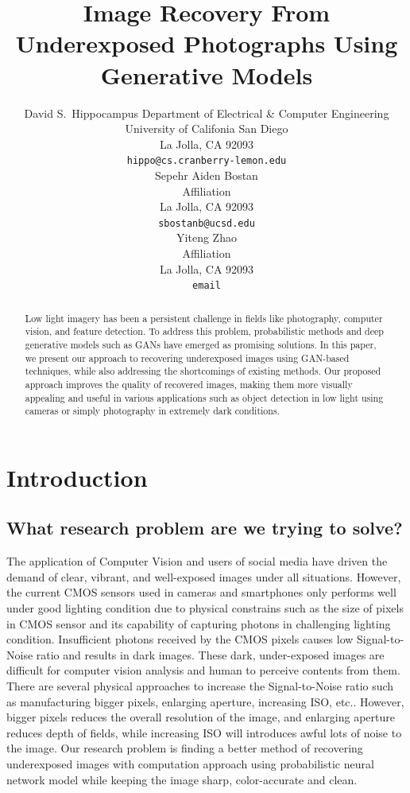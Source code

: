 \documentclass{article}
\title{Image Recovery From Underexposed Photographs Using Generative Models}
\author{
  David S.~Hippocampus
  Department of Electrical & Computer Engineering\\
  University of Califonia San Diego\\
  La Jolla, CA 92093 \\
  \texttt{hippo@cs.cranberry-lemon.edu} \\
  \And
  Sepehr Aiden Bostan\\
  Affiliation\\
  La Jolla, CA 92093\\
  \texttt{sbostanb@ucsd.edu}\\
  \And
  Yiteng Zhao \\
  Affiliation \\
  La Jolla, CA 92093 \\
  \texttt{email} \\
}
\begin{document}
\maketitle

\begin{abstract}
  Low light imagery has been a persistent challenge in fields like photography, computer vision, and feature detection. To address this problem, probabilistic methods and deep generative models such as GANs have emerged as promising solutions. In this paper, we present our approach to recovering underexposed images using GAN-based techniques, while also addressing the shortcomings of existing methods. Our proposed approach improves the quality of recovered images, making them more visually appealing and useful in various applications such as object detection in low light using cameras or simply photography in extremely dark conditions.
\end{abstract}



\section{Introduction}
\subsection{What research problem are we trying to solve?}
The application of Computer Vision and users of social media have driven the demand of clear, vibrant, and well-exposed images under all situations. However, the current CMOS sensors used in cameras and smartphones only performs well under good lighting condition due to physical constrains such as the size of pixels in CMOS sensor and its capability of capturing photons in challenging lighting condition. Insufficient photons received by the CMOS pixels causes low Signal-to-Noise ratio and results in dark images. These dark, under-exposed images are difficult for computer vision analysis and human to perceive contents from them. There are several physical approaches to increase the Signal-to-Noise ratio such as manufacturing bigger pixels, enlarging aperture, increasing ISO, etc.. However, bigger pixels reduces the overall resolution of the image, and enlarging aperture reduces depth of fields, while increasing ISO will introduces awful lots of noise to the image. Our research problem is finding a better method of recovering underexposed images with computation approach using probabilistic neural network model while keeping the image sharp, color-accurate and clean. 
\end{document}
